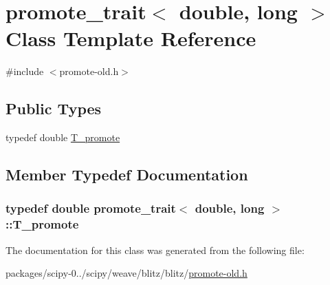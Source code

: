 \hypertarget{classpromote__trait_3_01double_00_01long_01_4}{}\section{promote\+\_\+trait$<$ double, long $>$ Class Template Reference}
\label{classpromote__trait_3_01double_00_01long_01_4}


{\ttfamily \#include $<$promote-\/old.\+h$>$}

\subsection*{Public Types}
\begin{DoxyCompactItemize}
\item 
typedef double \hyperlink{classpromote__trait_3_01double_00_01long_01_4_a8c47cbf3b5f3096bf8c18d7c15588d2b}{T\+\_\+promote}
\end{DoxyCompactItemize}


\subsection{Member Typedef Documentation}
\hypertarget{classpromote__trait_3_01double_00_01long_01_4_a8c47cbf3b5f3096bf8c18d7c15588d2b}{}
\subsubsection[{T\+\_\+promote}]{\setlength{\rightskip}{0pt plus 5cm}typedef double {\bf promote\+\_\+trait}$<$ double, long $>$\+::{\bf T\+\_\+promote}}\label{classpromote__trait_3_01double_00_01long_01_4_a8c47cbf3b5f3096bf8c18d7c15588d2b}


The documentation for this class was generated from the following file\+:\begin{DoxyCompactItemize}
\item 
packages/scipy-\/0../scipy/weave/blitz/blitz/\hyperlink{promote-old_8h}{promote-\/old.\+h}\end{DoxyCompactItemize}
